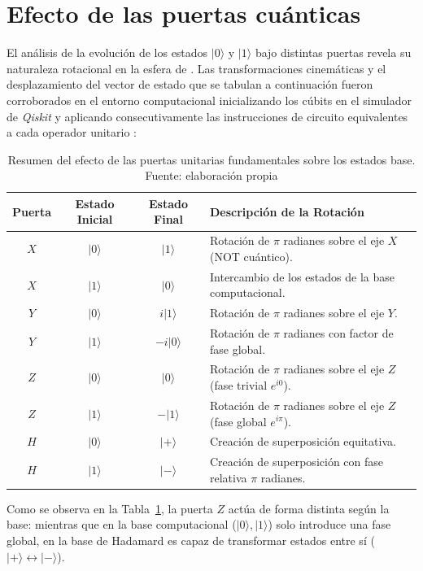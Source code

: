 \documentclass[11pt,a4paper,spanish]{book}
\begin{document}
\section{Efecto de las puertas cuánticas}
El análisis de la evolución de los estados $|0\rangle$ y $|1\rangle$ bajo distintas puertas revela su naturaleza rotacional en la esfera de \cite{bloch1946}. Las transformaciones cinemáticas y el desplazamiento del vector de estado que se tabulan a continuación fueron corroborados en el entorno computacional inicializando los cúbits en el simulador de \textit{Qiskit} y aplicando consecutivamente las instrucciones de circuito equivalentes a cada operador unitario \citep{qiskit2023}:

\begin{table}[H]
\centering
\begin{tabular}{|c|c|c|l|}
\hline
\textbf{Puerta} & \textbf{Estado Inicial} & \textbf{Estado Final} & \textbf{Descripción de la Rotación} \\ \hline
$X$ & $|0\rangle$ & $|1\rangle$ & Rotación de $\pi$ radianes sobre el eje $X$ (NOT cuántico). \\ \hline
$X$ & $|1\rangle$ & $|0\rangle$ & Intercambio de los estados de la base computacional. \\ \hline
$Y$ & $|0\rangle$ & $i|1\rangle$ & Rotación de $\pi$ radianes sobre el eje $Y$. \\ \hline
$Y$ & $|1\rangle$ & $-i|0\rangle$ & Rotación de $\pi$ radianes con factor de fase global. \\ \hline
$Z$ & $|0\rangle$ & $|0\rangle$ & Rotación de $\pi$ radianes sobre el eje $Z$ (fase trivial $e^{i0}$). \\ \hline
$Z$ & $|1\rangle$ & $-|1\rangle$ & Rotación de $\pi$ radianes sobre el eje $Z$ (fase global $e^{i\pi}$). \\ \hline
$H$ & $|0\rangle$ & $|+\rangle$ & Creación de superposición equitativa. \\ \hline
$H$ & $|1\rangle$ & $|-\rangle$ & Creación de superposición con fase relativa $\pi$ radianes. \\ \hline
\end{tabular}
\caption{Resumen del efecto de las puertas unitarias fundamentales sobre los estados base. Fuente: elaboración propia}
\label{tab:puertas}
\end{table}

Como se observa en la Tabla~\ref{tab:puertas}, la puerta $Z$ \citep{pauli1927} actúa de forma distinta según la base: mientras que en la base computacional ($|0\rangle, |1\rangle$) solo introduce una fase global, en la base de Hadamard \citep{deutsch1985} es capaz de transformar estados entre sí ($|+\rangle \leftrightarrow |-\rangle$).
\end{document}
